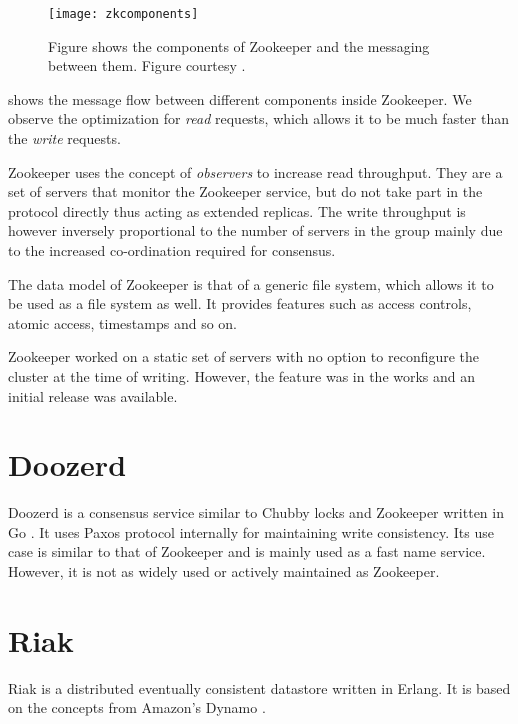 \begin{figure}
  \texttt{[image: zkcomponents]}
  \caption[Zookeeper Components]{%
    Figure shows the components of Zookeeper and the messaging between them.
    Figure courtesy \citet{zookeeper}.}
  \label{figure:zookeeper}
\end{figure}

 shows the message flow between different components inside
Zookeeper. We observe the optimization for \emph{read} requests, which allows it
to be much faster than the \emph{write} requests.

Zookeeper uses the concept of \emph{observers} to increase read throughput. They
are a set of servers that monitor the Zookeeper service, but do not take part
in the protocol directly thus acting as extended replicas. The write throughput
is however inversely proportional to the number of servers in the group mainly
due to the increased co-ordination required for consensus.

The data model of Zookeeper is that of a generic file system, which allows it
to be used as a file system as well. It provides features such as access
controls, atomic access, timestamps and so on.

Zookeeper worked on a static set of servers with no option to reconfigure the
cluster at the time of writing. However, the feature was in the works
\citep{zab2012} and an initial release was available.

\section{Doozerd}

Doozerd \citep{doozerd} is a consensus service similar to Chubby locks
 and Zookeeper  written in
Go \citep{golang}. It uses Paxos protocol internally for maintaining
write consistency. Its use case is similar to that of Zookeeper and is
mainly used as a fast name service. However, it is not as widely used
or actively maintained as Zookeeper.

\section{Riak}

Riak \citep{riak} is a distributed eventually consistent datastore written in
Erlang. It is based on the concepts from Amazon's Dynamo \citep{DeCandia07}.

